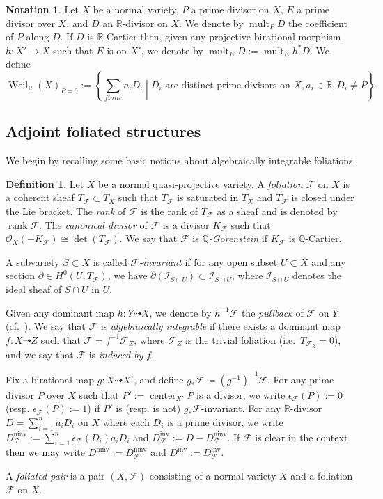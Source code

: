 \documentclass[11pt,reqno]{amsart}
\numberwithin{equation}{section}
\newcommand{\Center}{\operatorname{center}}
\newcommand{\rk}{\operatorname{rank}}
\newcommand{\ninv}{\operatorname{ninv}}
\newcommand{\inv}{\operatorname{inv}}
\newcommand{\Weil}{\operatorname{Weil}}
\newcommand{\mult}{\operatorname{mult}}
\newcommand{\Ff}{\mathcal{F}}
\theoremstyle{definition}
\newtheorem{defn}[thm]{Definition}
\newtheorem{nota}[thm]{Notation}
\begin{document}
\begin{nota}\label{nota: special notation}
Let $X$ be a normal variety, $P$ a prime divisor on $X$, $E$ a prime divisor over $X$, and $D$ an $\mathbb R$-divisor on $X$. We denote by $\mult_PD$ the coefficient of $P$ along $D$. If $D$ is $\mathbb R$-Cartier then, given any projective birational morphism $h\colon X'\rightarrow X$ such that $E$ is on $X'$, we denote by $\mult_ED:=\mult_Eh^*D$. We define
    \[\Weil_{\mathbb R}(X)_{P=0}:=\left\{\sum_{finite} a_iD_i\middle| D_i\text{ are distinct prime divisors on } X, a_i\in\mathbb R, D_i\neq P\right\}.\]
\end{nota}

\subsection{Adjoint foliated structures}

We begin by recalling some basic notions about algebraically integrable foliations.

\begin{defn}\label{defn: foliation}
Let $X$ be a normal quasi-projective variety. 
A \emph{foliation} $\Ff$ on $X$ is a coherent sheaf $T_{\Ff}\subset T_X$ such that $T_{\Ff}$ is saturated in $T_X$ and $T_{\Ff}$ is closed under the Lie bracket. 
The \emph{rank} of $\Ff$ is the rank of $T_\Ff$ as a sheaf and is denoted by $\rk\Ff$. 
The \emph{canonical divisor} of $\Ff$ is a divisor $K_\Ff$ such that $\mathcal{O}_X(-K_{\Ff})\cong\det(T_\Ff)$. 
We say that $\Ff$ is \emph{$\mathbb Q$-Gorenstein} if $K_{\Ff}$ is $\mathbb Q$-Cartier.


A subvariety $S\subset X$ is called \emph{$\Ff$-invariant} if for any open subset $U\subset X$ and any section $\partial\in H^0(U,T_\Ff)$, we have $\partial(\mathcal{I}_{S\cap U})\subset \mathcal{I}_{S\cap U}$, where $\mathcal{I}_{S\cap U}$ denotes the ideal sheaf of $S\cap U$ in $U$. 

Given any dominant map 
$h\colon Y\dashrightarrow X$, we denote by $h^{-1}\Ff$ the \emph{pullback} of $\Ff$ on $Y$ (cf.~\cite[\S~3.2]{Dru21}). We say that $\Ff$ is \emph{algebraically integrable} if there exists a dominant map $f\colon X\dashrightarrow Z$ such that $\Ff=f^{-1}\Ff_Z$, where $\Ff_Z$ is the trivial foliation (i.e.\ $T_{\Ff_Z}=0$), and we say that $\Ff$ is \emph{induced by} $f$. 

Fix a birational map
$g\colon X\dashrightarrow X'$, and define $g_\ast \Ff\coloneqq (g^{-1})^{-1}\Ff$. 
For any prime divisor $P$ over $X$ such that $P':=\Center_{X'}P$ is a divisor, we write $\epsilon_{\Ff}(P):=0$ (resp. $\epsilon_{\Ff}(P):=1$) if $P'$ is (resp. is not) $g_*\Ff$-invariant. 
For any $\mathbb R$-divisor $D=\sum_{i=1}^na_iD_i$ on $X$ where each $D_i$ is a prime divisor, we write $D_{\Ff}^{\ninv}:=\sum_{i=1}^n\epsilon_{\Ff}(D_i)a_iD_i$ and $D_{\Ff}^{\inv}:=D-D_{\Ff}^{\ninv}$. 
If $\Ff$ is clear in the context then we may write
$D^{\ninv}:=D_{\Ff}^{\ninv}$ and $D^{\inv}:=D_{\Ff}^{\inv}$.

A \emph{foliated pair} is a pair $(X,\Ff)$ consisting of a normal variety $X$ and a foliation $\Ff$ on $X$.
\end{defn}
\end{document}
